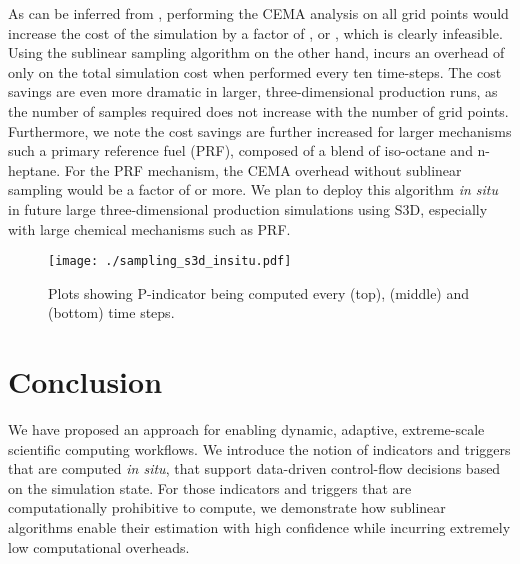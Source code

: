 \documentclass[final]{siamltex}
\newcommand{\pmetric}{P}
\begin{document}
As can be inferred from , performing the 
CEMA analysis on all grid points would increase the cost of the simulation by a factor of , or , which 
is clearly infeasible. Using the sublinear sampling algorithm on the other hand, incurs an overhead of only  
on the total simulation cost when performed every ten time-steps.  The cost
savings are even more dramatic in larger, three-dimensional production runs, as
the number of samples required does not increase with the number of grid
points.  Furthermore, we note the cost savings are further increased for 
larger mechanisms such a primary reference fuel (PRF), composed of a blend of
iso-octane and n-heptane.  For the PRF mechanism, the CEMA 
overhead without sublinear sampling would be a factor of  or more. We plan
to deploy this algorithm \emph{in situ} in future 
large three-dimensional production simulations using S3D, especially with large chemical mechanisms such as PRF.     

\begin{figure}[htpb]
\texttt{[image: ./sampling\_s3d\_insitu.pdf]}
\caption{\label{fig:M_p_insitu} Plots showing \pmetric-indicator being computed every  (top), 
 (middle) and  (bottom) time steps. }
\end{figure}

\section{Conclusion}
\label{sec:conc} 
We have proposed an approach for enabling dynamic, adaptive, extreme-scale 
scientific computing workflows.  We introduce the notion of indicators and 
triggers that are computed \emph{in situ}, that support data-driven control-flow 
decisions based on the simulation state. For those indicators and triggers that
are computationally prohibitive to compute, we demonstrate how sublinear 
algorithms enable their estimation with high confidence while incurring 
extremely low computational overheads.
\end{document}
